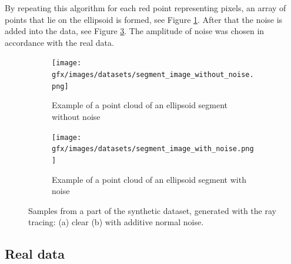 By repeating this algorithm for each red point representing pixels, an array of points that lie on the ellipsoid is formed, see Figure \ref{fig:synth_segment_clean}.
After that the noise is added into the data, see Figure \ref{fig:synth_segment_noise}.
The amplitude of noise was chosen in accordance with the real data.

\begin{figure}
  \centering

  \begin{subfigure}[b]{0.42\textwidth}
      \centering
      \texttt{[image: gfx/images/datasets/segment\_image\_without\_noise.png]}
      \caption{Example of a point cloud of an ellipsoid segment without noise}
      \label{fig:synth_segment_clean}
  \end{subfigure}
  \hfill
  \begin{subfigure}[b]{0.42\textwidth}
      \centering
      \texttt{[image: gfx/images/datasets/segment\_image\_with\_noise.png]}
      \caption{Example of a point cloud of an ellipsoid segment with noise}
      \label{fig:synth_segment_noise}
  \end{subfigure}
  \caption{Samples from a part of the synthetic dataset, generated with the ray tracing: (a) clear (b) with additive normal noise.}
\end{figure}



\subsection{Real data}
\label{subsec_real_data}


